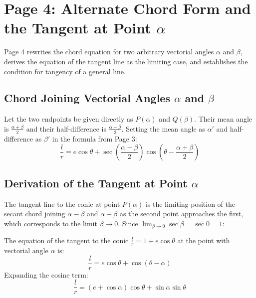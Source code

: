 \newpage
\section{Page 4: Alternate Chord Form and the Tangent at Point $\alpha$}
\label{sec:page04}

\begin{conceptbox}
Page 4 rewrites the chord equation for two arbitrary vectorial angles $\alpha$ and $\beta$, derives the equation of the tangent line as the limiting case, and establishes the condition for tangency of a general line.
\end{conceptbox}

\subsection{Chord Joining Vectorial Angles $\alpha$ and $\beta$}
Let the two endpoints be given directly as $P(\alpha)$ and $Q(\beta)$.
Their mean angle is $\frac{\alpha + \beta}{2}$ and their half-difference is $\frac{\alpha - \beta}{2}$.
Setting the mean angle as $\alpha'$ and half-difference as $\beta'$ in the formula from Page 3:
\begin{equation}
    \boxed{\frac{l}{r} = e\cos\theta + \sec\left(\frac{\alpha - \beta}{2}\right)\cos\left(\theta - \frac{\alpha + \beta}{2}\right)}
\end{equation}

\subsection{Derivation of the Tangent at Point $\alpha$}
The tangent line to the conic at point $P(\alpha)$ is the limiting position of the secant chord joining $\alpha - \beta$ and $\alpha + \beta$ as the second point approaches the first, which corresponds to the limit $\beta \to 0$.
Since $\lim_{\beta \to 0} \sec\beta = \sec 0 = 1$:

\begin{theorembox}
The equation of the tangent to the conic $\frac{l}{r} = 1 + e\cos\theta$ at the point with vectorial angle $\alpha$ is:
\begin{equation}
    \boxed{\frac{l}{r} = e\cos\theta + \cos(\theta - \alpha)}
\end{equation}
Expanding the cosine term:
\begin{equation}
    \boxed{\frac{l}{r} = (e + \cos\alpha)\cos\theta + \sin\alpha\sin\theta}
\end{equation}
\end{theorembox}

